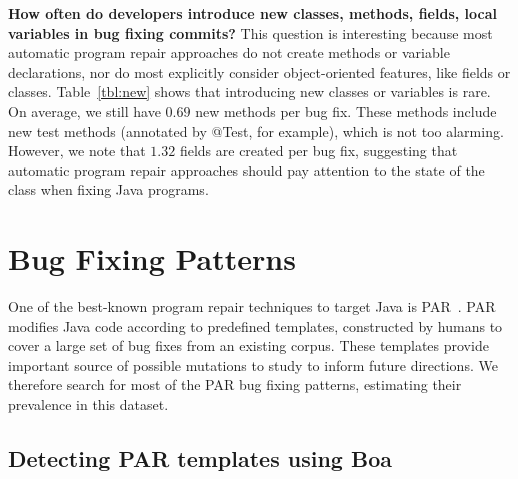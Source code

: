 \documentclass{sig-alternate-05-2015}
\begin{document}
\vspace{1ex}
\noindent\textbf{How often do developers introduce new classes, methods, fields,
	local variables in
bug fixing commits?} 
%
This question is interesting because most automatic program repair approaches
do not create methods or variable declarations, nor do most explicitly consider
object-oriented features, like fields or classes. 
%
Table~\ref{tbl:new} shows that introducing new
classes or variables is rare. On average, we still have $0.69$ new methods
per bug fix. These methods include new test methods (annotated by
@Test, for example), which is not too alarming. However, we note
that $1.32$ fields are created per bug fix, suggesting
that automatic program repair approaches should pay attention to the state of
the class when fixing Java programs.


\section{Bug Fixing Patterns}\label{sec:method}

One of the best-known program repair techniques to target Java is
PAR~\cite{kim2013}.  PAR
modifies Java code according to predefined templates, constructed by humans
to cover a large set of bug fixes from an existing corpus.  These templates provide
important source of possible 
mutations to study to inform future directions. 
We therefore search for most of the PAR bug fixing patterns,
estimating their prevalence in this
dataset.


\subsection{Detecting PAR templates using Boa}
\end{document}
